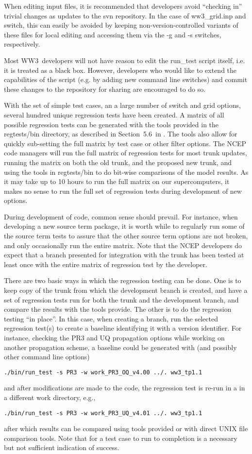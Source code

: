 \documentclass[12pt]{article}
\newcommand{\manref}{tol:MMABmanual}
\newcommand{\manregtestsec}{5.6}
\newcommand{\ws}{WW3}
\newcommand{\file}{\sf}
\newcommand{\code}{\tt}
\newcommand{\command}[1]{\begin{center}{\code #1}\end{center}}
\begin{document}
When editing input files, it is recommended that developers avoid ``checking
in'' trivial changes as updates to the svn repository. In the case of {\file
  ww3\_grid.inp} and {\file switch}, this can easily be avoided by keeping
non-version-controlled variants of these files for local editing and accessing
them via the -g and -s switches, respectively.

Most \ws\ developers will not have reason to edit the {\file run\_test} script
itself, i.e. it is treated as a black box. However, developers who would like
to extend the capabilities of the script (e.g. by adding new command line
switches) and commit these changes to the repository for sharing are
encouraged to do so.

\vspace{\baselineskip} \noindent With the set of simple test cases, an a large
number of switch and grid options, several hundred unique regression tests
have been created. A matrix of all possible regression tests can be generated
with the tools provided in the {\file regtests/bin} directory, as described in
Section~\manregtestsec\ in \cite{\manref}. The tools also allow for quickly
sub-setting the full matrix by test case or other filter options. The NCEP
code managers will run the full matrix of regression tests for most trunk
updates, running the matrix on both the old trunk, and the proposed new trunk,
and using the tools in {\file regtests/bin} to do bit-wise comparisons of the
model results. As it may take up to 10 hours to run the full matrix on our
supercomputers, it makes no sense to run the full set of regression tests
during development of new options.

During development of code, common sense should prevail. For instance, when
developing a new source term package, it is worth while to regularly run some
of the source term tests to assure that the other source term options are not
broken, and only occasionally run the entire matrix. Note that the NCEP
developers do expect that a branch presented for integration with the trunk
has been tested at least once with the entire matrix of regression test by the
developer.

There are two basic ways in which the regression testing can be done. One is
to keep copy of the trunk from which the development branch is created, and
have a set of regression tests run for both the trunk and the development
branch, and compare the results with the tools provide. The other is to do the
regression testing ``in place''. In this case, when creating a branch, run the
selected regression test(s) to create a baseline identifying it with a version
identifier. For instance, checking the PR3 and UQ propagation options while
working on another propagation scheme, a baseline could be generated with (and
possibly other command line options) \command{./bin/run\_test -s PR3 -w
  work\_PR3\_OQ\_v4.00 ../. ww3\_tp1.1} and after modifications are made to
the code, the regression test is re-run in a in a different work directory,
e.g., \command{./bin/run\_test -s PR3 -w work\_PR3\_UQ\_v4.01 ../. ww3\_tp1.1}
after which results can be compared using tools provided or with direct UNIX
file comparison tools.  Note that for a test case to run to completion is a
necessary but not sufficient indication of success.
\end{document}

